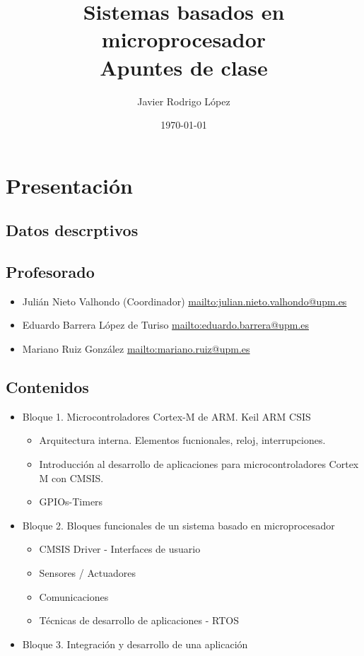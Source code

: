 \documentclass[10pt]{article}
\title{\Huge Sistemas basados en microprocesador\\\huge Apuntes de clase}
\author{Javier Rodrigo López}
\date{\today}
\begin{document}
\maketitle

\tableofcontents


\newpage

\section{Presentación}

\subsection{Datos descrptivos}

\subsection{Profesorado}

\begin{itemize}
  \item Julián Nieto Valhondo (Coordinador) \href{julian.nieto.valhondo@upm.es}{mailto:julian.nieto.valhondo@upm.es}
  \item Eduardo Barrera López de Turiso \href{eduardo.barrera@upm.es}{mailto:eduardo.barrera@upm.es}
  \item Mariano Ruiz González \href{mariano.ruiz@upm.es}{mailto:mariano.ruiz@upm.es}
\end{itemize}

\subsection{Contenidos}

\begin{itemize}
  \item Bloque 1. Microcontroladores Cortex-M de ARM. Keil ARM CSIS
        \begin{itemize}
          \item Arquitectura interna. Elementos fucnionales, reloj, interrupciones.
          \item Introducción al desarrollo de aplicaciones para microcontroladores Cortex M con CMSIS.
          \item GPIOs-Timers
        \end{itemize}
  \item Bloque 2. Bloques funcionales de un sistema basado en microprocesador
        \begin{itemize}
          \item CMSIS Driver - Interfaces de usuario
          \item Sensores / Actuadores
          \item Comunicaciones
          \item Técnicas de desarrollo de aplicaciones - RTOS
        \end{itemize}
  \item Bloque 3. Integración y desarrollo de una aplicación
\end{itemize}
\end{document}
